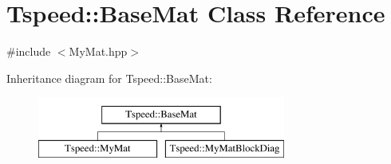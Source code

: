 \hypertarget{classTspeed_1_1BaseMat}{\section{Tspeed\-:\-:Base\-Mat Class Reference}
\label{classTspeed_1_1BaseMat}
}


{\ttfamily \#include $<$My\-Mat.\-hpp$>$}

Inheritance diagram for Tspeed\-:\-:Base\-Mat\-:\begin{figure}[H]
\begin{center}
\leavevmode
\includegraphics[height=2.000000cm]{classTspeed_1_1BaseMat}
\end{center}
\end{figure}
